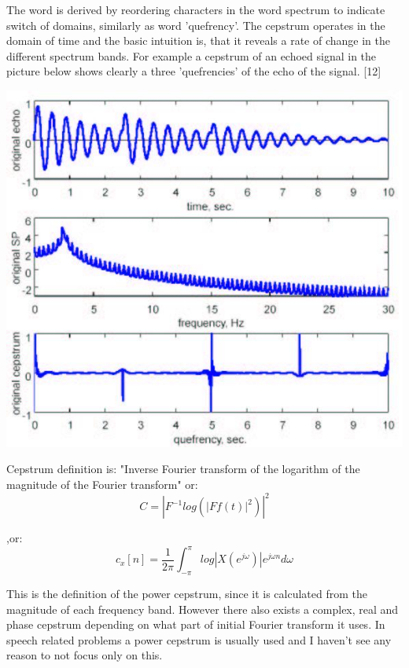\documentclass[12pt,a4paper,english]{article}
\begin{document}
The word is derived by reordering characters in the word spectrum to indicate switch of domains, similarly as word 'quefrency'. The cepstrum operates in the domain of time and the basic intuition is, that it reveals a rate of change in the different spectrum bands. 
For example a cepstrum of an echoed signal in the picture below shows clearly a three 'quefrencies' of the echo of the signal. [12]
\begin{center}
    \includegraphics[scale=0.4]{echo_cepstrum.jpg}
\end {center}


Cepstrum definition is: "Inverse Fourier transform of the logarithm of the magnitude of the Fourier transform" or:
\begin{equation}
    C=|F^{-1}{log(|F{f(t)}|^2)}|^2
\end{equation}

,or:
\begin{equation}
    c_x[n] = \frac{1}{2\pi} \int_{-\pi}^{\pi}log |X(e^{j \omega})| e^{j \omega n} d\omega
\end{equation}

This is the definition of the power cepstrum, since it is calculated from the magnitude of each frequency band. However there also exists a complex, real and phase cepstrum depending on what part of initial Fourier transform it uses.
In speech related problems a power cepstrum is usually used and I haven't see any reason to not focus only on this.
\end{document}
